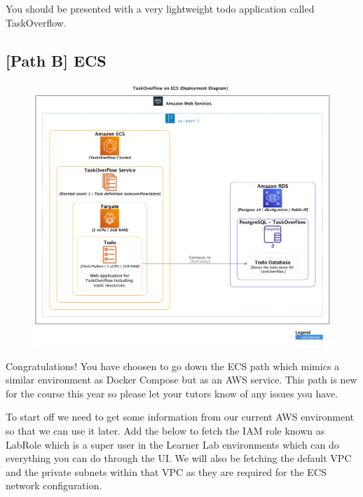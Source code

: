 \documentclass{csse4400}
\begin{document}

You should be presented with a very lightweight todo application called TaskOverflow.

\subsection{[Path B] ECS}
\label{pathb}


\begin{figure}[H]
  \includegraphics[width=\textwidth]{diagrams/ecsdeployment}
\end{figure}

Congratulations! You have choosen to go down the ECS path which mimics a similar environment as Docker Compose but as an AWS service.
This path is new for the course this year so please let your tutors know of any issues you have.

To start off we need to get some information from our current AWS environment so that we can use it later.
Add the below to fetch the IAM role known as LabRole which is a super user in the Learner Lab environments which can do everything you can do through the UI.
We will also be fetching the default VPC and the private subnets within that VPC as they are required for the ECS network configuration.
\end{document}
